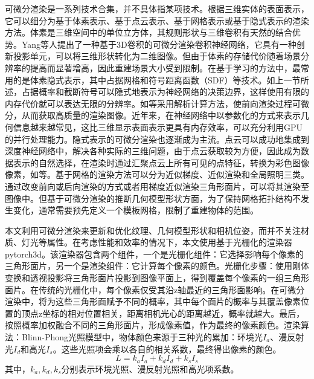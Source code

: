 可微分渲染是一系列技术合集，并不具体指某项技术。根据三维实体的表面表示，它可以细分为基于体素表示、基于点云表示、基于网格表示或基于隐式表示的渲染方法。体素是三维空间中的单位立方体，其规则形状与三维卷积有天然的结合优势。Yang等人提出了一种基于3D卷积的可微分渲染卷积神经网络，它具有一种创新投影单元，可以将三维形状转化为二维图像。但由于体素的存储代价随着场景分辨率的提高而显著增高，因此重建场景大小受到限制。在基于学习的方法中，最常用的是体素隐式表示，其中占据网格和符号距离函数（SDF）等技术。如上一节所述，占据概率和截断符号可以隐式地表示为神经网络的决策边界，这样使用有限的内存代价就可以表达无限的分辨率。如等采用解析计算方法，使前向渲染过程可微分，从而获取高质量的渲染图像。近年来，在神经网络中以参数化的方式来表示几何信息越来越常见，这比三维显示表面表示更具有内存效率，可以充分利用GPU的并行处理能力。隐式表示的可微分渲染也逐渐成为主流。点云可以成功地集成到深度神经网络中，解决各种实际的三维问题，由于点云获取较为方便，因此成为数据表示的自然选择，在渲染时通过汇聚点云上所有可见的点特征，转换为彩色图像像素，如等。基于网格的渲染方法可以分为近似梯度、近似渲染和全局照明三类。通过改变前向或后向渲染的方式或者用梯度近似渲染三角形面片，可以将其渲染至图像中。但基于可微分渲染的推断几何模型形状方面，为了保持网格拓扑结构不发生变化，通常需要预先定义一个模板网格，限制了重建物体的范围。\par

本文利用可微分渲染来更新和优化纹理、几何模型形状和相机位姿，而并不关注材质、灯光等属性。在考虑性能和效率的情况下，本文使用基于光栅化的渲染器pytorch3d。该渲染器包含两个组件，一个是光栅化组件：它选择影响每个像素的三角形面片，另一个是渲染组件：它计算每个像素的颜色。光栅化步骤：使用刚体变换和透视投影将三角形面片投影到图像平面上，得到覆盖每个像素的一组三角形面片。在传统的光栅化中，每个像素仅受其沿z轴最近的三角形面影响。在可微分渲染中，将为这些三角形面赋予不同的概率，其中每个面片的概率与其覆盖像素位置的顶点z坐标的相对位置相关，距离相机光心的距离越近，概率就越大。最后，按照概率加权融合不同的三角形面片，形成像素值，作为最终的像素颜色。渲染算法：Blinn-Phong光照模型中，物体颜色来源于三种光的累加：环境光$I_a$、漫反射光$I_d$和高光$I_s$。这些光照项会乘以各自的相关系数，最终得出像素的颜色。
\begin{equation}
    L = k_aI_a + k_dI_d+k_sI_s
\end{equation}
其中，$k_a,k_d,k_s$分别表示环境光照、漫反射光照和高光项系数。


